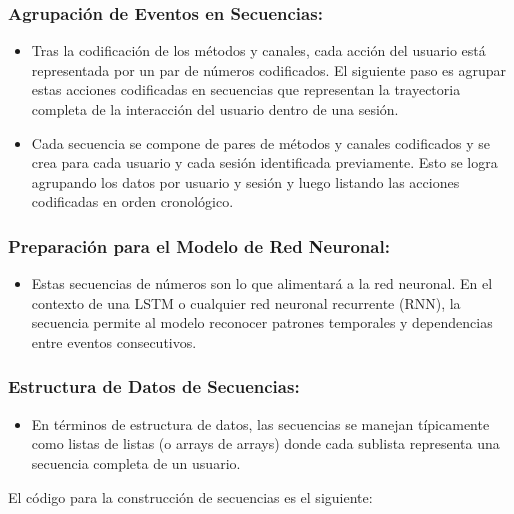 \subsubsection{Agrupación de Eventos en Secuencias:}

\begin{itemize}
    \item Tras la codificación de los métodos y canales, cada acción del usuario está representada por un par de números codificados. El siguiente paso es agrupar estas acciones codificadas en secuencias que representan la trayectoria completa de la interacción del usuario dentro de una sesión.
    \item Cada secuencia se compone de pares de métodos y canales codificados y se crea para cada usuario y cada sesión identificada previamente. Esto se logra agrupando los datos por usuario y sesión y luego listando las acciones codificadas en orden cronológico.
\end{itemize}

\subsubsection{Preparación para el Modelo de Red Neuronal:}

\begin{itemize}
    \item Estas secuencias de números son lo que alimentará a la red neuronal. En el contexto de una LSTM o cualquier red neuronal recurrente (RNN), la secuencia permite al modelo reconocer patrones temporales y dependencias entre eventos consecutivos.
\end{itemize}

\subsubsection{Estructura de Datos de Secuencias:}

\begin{itemize}
    \item En términos de estructura de datos, las secuencias se manejan típicamente como listas de listas (o arrays de arrays) donde cada sublista representa una secuencia completa de un usuario.
\end{itemize}

El código para la construcción de secuencias es el siguiente:

